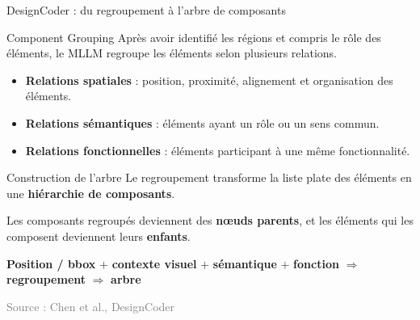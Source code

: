 \documentclass[aspectratio=169,11pt]{beamer}
\newcommand{\source}[1]{\scriptsize\textcolor{gray}{Source : #1}}
\begin{document}
\begin{frame}{DesignCoder : du regroupement à l'arbre de composants}

\begin{block}{Component Grouping}
Après avoir identifié les régions et compris le rôle des éléments,
le MLLM regroupe les éléments selon plusieurs relations.
\end{block}

\begin{itemize}

\item \textbf{Relations spatiales} :
position, proximité, alignement et organisation des éléments.

\item \textbf{Relations sémantiques} :
éléments ayant un rôle ou un sens commun.

\item \textbf{Relations fonctionnelles} :
éléments participant à une même fonctionnalité.

\end{itemize}

\vspace{0.15cm}

\begin{block}{Construction de l'arbre}
Le regroupement transforme la liste plate des éléments en une
\textbf{hiérarchie de composants}.

Les composants regroupés deviennent des \textbf{nœuds parents},
et les éléments qui les composent deviennent leurs \textbf{enfants}.
\end{block}

\vspace{0.15cm}


\vspace{0.1cm}

\begin{center}
\textbf{Position / bbox}
$+$
\textbf{contexte visuel}
$+$
\textbf{sémantique}
$+$
\textbf{fonction}
$\Rightarrow$
\textbf{regroupement}
$\Rightarrow$
\textbf{arbre}
\end{center}

\source{Chen et al., DesignCoder}
\end{frame}


\end{document}
